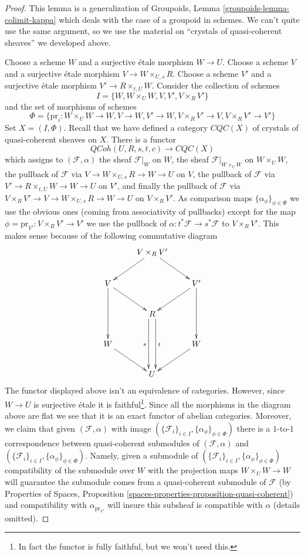\documentclass[10pt,a4paper]{amsart}
\theoremstyle{plain}
\theoremstyle{definition}
\theoremstyle{remark}
\numberwithin{equation}{subsection}
\def\QCoh{\mathit{QCoh}}
\begin{document}
\begin{proof}
This lemma is a generalization of
Groupoids, Lemma \ref{groupoids-lemma-colimit-kappa}
which deals with the case of a groupoid in schemes.
We can't quite use the same argument, so we use the
material on ``crystals of quasi-coherent sheaves'' we developed above.

\medskip\noindent
Choose a scheme $W$ and a surjective \'etale morphism $W \to U$.
Choose a scheme $V$ and a surjective \'etale morphism
$V \to W \times_{U, s} R$. Choose a scheme $V'$
and a surjective \'etale morphism $V' \to R \times_{t, U} W$.
Consider the collection of schemes
$$
I = \{W, W \times_U W, V, V', V \times_R V'\}
$$
and the set of morphisms of schemes
$$
\Phi = \{\text{pr}_i : W \times_U W \to W, V \to W, V' \to W,
V \times_R V' \to V, V \times_R V' \to V'\}
$$
Set $X = (I, \Phi)$. Recall that we have defined a category $\textit{CQC}(X)$
of crystals of quasi-coherent sheaves on $X$. There is a functor
$$
\QCoh(U, R, s, t, c) \longrightarrow \textit{CQC}(X)
$$
which assigns to $(\mathcal{F}, \alpha)$ the sheaf $\mathcal{F}|_W$ on $W$,
the sheaf $\mathcal{F}|_{W \times_U W}$ on $W \times_U W$, the
pullback of $\mathcal{F}$ via $V \to W \times_{U, s} R \to W \to U$
on $V$, the pullback of $\mathcal{F}$ via
$V' \to R \times_{t, U} W \to W \to U$ on $V'$, and finally the
pullback of $\mathcal{F}$ via
$V \times_R V' \to V \to W \times_{U, s} R \to W \to U$ on $V \times_R V'$.
As comparison maps $\{\alpha_\phi\}_{\phi \in \Phi}$
we use the obvious ones (coming from associativity of pullbacks)
except for the map
$\phi = \text{pr}_{V'} : V \times_R V' \to V'$ we use the pullback
of $\alpha : t^*\mathcal{F} \to s^*\mathcal{F}$ to $V \times_R V'$.
This makes sense because of the following commutative diagram
$$
\xymatrix{
& V \times_R V' \ar[ld] \ar[rd] \\
V \ar[rd] \ar[dd] & & V' \ar[ld] \ar[dd] \\
& R \ar@<-1ex>[dd]_s \ar@<1ex>[dd]^t \\
W \ar[rd] & & W \ar[ld] \\
& U
}
$$
The functor displayed above isn't an equivalence of categories.
However, since $W \to U$ is surjective \'etale it is faithful\footnote{In
fact the functor is fully faithful, but we won't need this.}.
Since all the morphisms in the diagram above are flat we see that
it is an exact functor of abelian categories. Moreover, we
claim that given $(\mathcal{F}, \alpha)$ with image
$(\{\mathcal{F}_i\}_{i \in I}, \{\alpha_\phi\}_{\phi \in \Phi})$
there is a $1$-to-$1$ correspondence between quasi-coherent submodules
of $(\mathcal{F}, \alpha)$ and
$(\{\mathcal{F}_i\}_{i \in I}, \{\alpha_\phi\}_{\phi \in \Phi})$.
Namely, given a submodule of
$(\{\mathcal{F}_i\}_{i \in I}, \{\alpha_\phi\}_{\phi \in \Phi})$
compatibility of the submodule over $W$ with the projection maps
$W \times_U W \to W$ will guarantee the submodule comes from a
quasi-coherent submodule of $\mathcal{F}$ (by
Properties of Spaces, Proposition
\ref{spaces-properties-proposition-quasi-coherent})
and compatibility with $\alpha_{\text{pr}_{V'}}$ will insure this
subsheaf is compatible with $\alpha$ (details omitted).


\end{proof}
\end{document}

